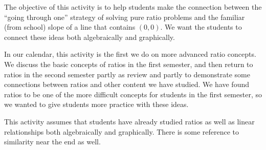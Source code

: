 \documentclass[nooutcomes]{ximera}
\begin{document}
\newpage
\begin{instructorNotes}
The objective of this activity is to help students make the connection between the ``going through one'' strategy of solving pure ratio problems and the familiar (from school) slope of a line that contains $(0, 0)$.  We want the students to connect these ideas both algebraically and graphically.  

In our calendar, this activity is the first we do on more advanced ratio concepts.  We discuss the basic concepts of ratios in the first semester, and then return to ratios in the second semester partly as review and partly to demonstrate some connections between ratios and other content we have studied.  We have found ratios to be one of the more difficult concepts for students in the first semester, so we wanted to give students more practice with these ideas.

This activity assumes that students have already studied ratios as well as linear relationships both algebraically and graphically.  There is some reference to similarity near the end as well.



\end{instructorNotes}
\end{document}

